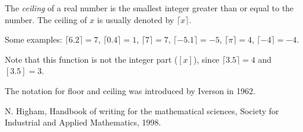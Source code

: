 \documentclass{article}
\begin{document}
The \emph{ceiling} of a real number is the smallest integer greater than or equal to the number. The ceiling of $x$ is usually denoted by $\lceil x\rceil$.

Some examples:
$\lceil 6.2\rceil=7$, $\lceil 0.4\rceil=1$, $\lceil 7\rceil=7$, $\lceil -5.1\rceil=-5$, $\lceil \pi\rceil=4$, $\lceil -4\rceil=-4$.

Note that this function is not the integer part ($[x]$), since 
$\lceil 3.5\rceil = 4$ and $[3.5]=3$.

The notation for floor and ceiling was introduced by Iverson in 1962\cite{Higham}.
 
\begin{thebibliography}{9}
 N. Higham, Handbook of writing for the mathematical sciences, Society for Industrial and Applied Mathematics, 1998.
\end{thebibliography}
\end{document}
